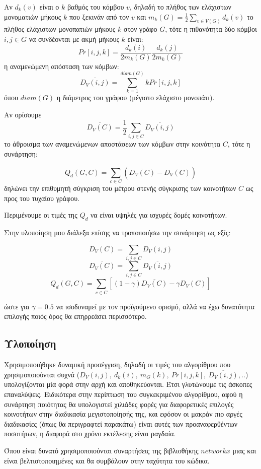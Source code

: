 \documentclass[12pt, letterpaper]{article}
\begin{document}
Αν $d_k(v)$ είναι ο $k$ βαθμός του κόμβου $v$, δηλαδή το πλήθος των 
ελάχιστων μονοματιών μήκους $k$ που ξεκινάν από τον $v$ και 
$m_k(G) = \frac{1}{2} \sum_{v \in V (G)} d_k(v)$ το πλήθος 
ελάχιστων μονοπατιών μήκους $k$ στον γράφο $G$, τότε η πιθανότητα δύο κόμβοι
$i,j \in G$ να συνδέονται με ακμή μήκους $k$ είναι:
\[ Pr[i,j,k] = \frac{d_k(i)}{2m_k(G)} \frac{d_k(j)}{2m_k(G)} \]
η αναμενώμενη απόσταση των κόμβων:
\[ \overline{D_V(i,j)} = \sum_{k=1}^{diam(G)} k Pr[i,j,k] \]
όπου $diam(G)$ η διάμετρος του γράφου (μέγιστο ελάχιστο μονοπάτι).

Αν ορίσουμε
\[ \overline{ D_V(C)  } = \frac{1}{2} \sum_{i,j \in C} \overline{ D_V(i,j) }\]
το άθροισμα των αναμενώμενων αποστάσεων των κόμβων στην κοινότητα $C$, 
τότε η συνάρτηση:

\[ Q_d(G,C) = \sum_{c \in C} (\overline{ D_V(C) } - D_V(C))\]
δηλώνει την επιθυμητή σύγκριση του μέτρου στενής σύγκρισης των κοινοτήτων 
$C$ ως προς του τυχαίου γράφου. 

Περιμένουμε οι τιμές της $Q_d$ να είναι υψηλές για ισχυρές δομές κοινοτήτων.


Στην υλοποίηση μου διάλεξα επίσης να τροποποιήσω την συνάρτηση ως εξίς:

\[ D_V(C) = \sum_{i,j \in C} D_V(i,j) \]
\[ \overline{ D_V(C)  } =  \sum_{i,j \in C} \overline{ D_V(i,j) }\]
\[ Q_d(G,C) = \sum_{c \in C} [(1 - \gamma)\overline{ D_V(C) } - \gamma D_V(C) ]\]

ώστε για $\gamma = 0.5$ να ισοδυναμεί με τον προϊγούμενο ορισμό, αλλά να έχω 
δυνατότητα επιλογής ποιός όρος θα επηρρεάσει περισσότερο.



\subsection{Υλοποίηση}


Χρησιμοποιήθηκε δυναμική προσέγγιση, δηλαδή οι τιμές του αλγορίθμου που χρησιμοποιούνται 
συχνά ($D_V(i,j), \ d_k(i), \ m_G(k), \ Pr[i,j,k],  \ \overline{D_V(i,j)},..$)
υπολογίζονται μία φορά στην αρχή και αποθηκεύονται. Έτσι γλυτώνουμε τις 
άσκοπες επαναλύψεις. Ειδικότερα στην περίπτωση του συγκεκριμένου αλγορίθμου, αφού 
η συνάρτηση ποιότητας θα υπολογιστεί χιλιάδες φορές για διαφορετικές 
επιλογές κοινοτήτων στην διαδικασία μεγιστοποίησής της, και εφόσον οι μακράν 
πιο αργές διαδικασίες (όπως θα περιγραφτεί παρακάτω) είναι αυτές των 
προαναφερθέντων ποσοτήτων, η διαφορά στο χρόνο εκτέλεσης είναι ραγδαία. 

Όπου είναι δυνατό χρησιμοποιούνται συναρτήσεις της βιβλιοθήκης $networkx$ μιας και 
είναι βελτιστοποιημένες και θα συμβάλουν στην ταχύτητα του κώδικα.
\end{document}
